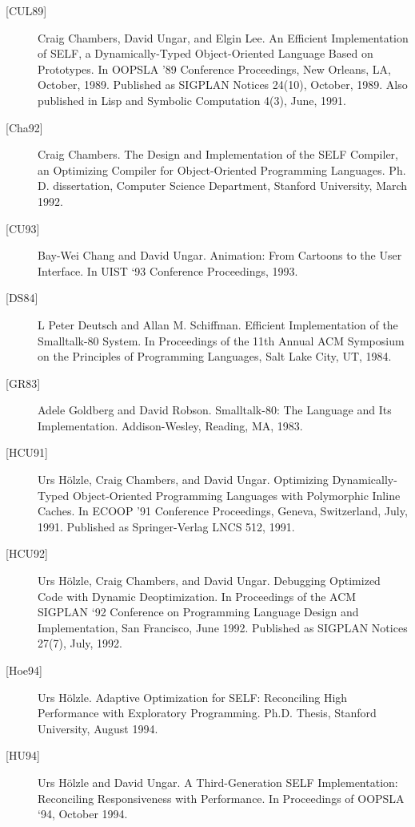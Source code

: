 \documentclass[letterpaper,10pt,english]{sphinxmanual}
\begin{document}
\begin{description}
\item[{{[}CUL89{]}}] \leavevmode
Craig Chambers, David Ungar, and Elgin Lee. An Efficient Implementation of SELF, a Dynamically-Typed Object-Oriented Language Based on Prototypes. In OOPSLA ’89 Conference Proceedings, New Orleans, LA, October, 1989. Published as SIGPLAN Notices 24(10), October, 1989. Also published in Lisp and Symbolic Computation 4(3), June, 1991.

\item[{{[}Cha92{]}}] \leavevmode
Craig Chambers. The Design and Implementation of the SELF Compiler, an Optimizing Compiler for Object-Oriented Programming Languages. Ph. D. dissertation, Computer Science Department, Stanford University, March 1992.

\item[{{[}CU93{]}}] \leavevmode
Bay-Wei Chang and David Ungar. Animation: From Cartoons to the User Interface. In UIST ‘93 Conference Proceedings, 1993.

\item[{{[}DS84{]}}] \leavevmode
L Peter Deutsch and Allan M. Schiffman. Efficient Implementation of the Smalltalk-80 System. In Proceedings of the 11th Annual ACM Symposium on the Principles of Programming Languages, Salt Lake City, UT, 1984.

\item[{{[}GR83{]}}] \leavevmode
Adele Goldberg and David Robson. Smalltalk-80: The Language and Its Implementation. Addison-Wesley, Reading, MA, 1983.

\item[{{[}HCU91{]}}] \leavevmode
Urs Hölzle, Craig Chambers, and David Ungar. Optimizing Dynamically-Typed Object-Oriented Programming Languages with Polymorphic Inline Caches. In ECOOP ’91 Conference Proceedings, Geneva, Switzerland, July, 1991. Published as Springer-Verlag LNCS 512, 1991.

\item[{{[}HCU92{]}}] \leavevmode
Urs Hölzle, Craig Chambers, and David Ungar. Debugging Optimized Code with Dynamic Deoptimization. In Proceedings of the ACM SIGPLAN ‘92 Conference on Programming Language Design and Implementation, San Francisco, June 1992. Published as SIGPLAN Notices 27(7), July, 1992.

\item[{{[}Hoe94{]}}] \leavevmode
Urs Hölzle. Adaptive Optimization for SELF: Reconciling High Performance with Exploratory Programming. Ph.D. Thesis, Stanford University, August 1994.

\item[{{[}HU94{]}}] \leavevmode
Urs Hölzle and David Ungar. A Third-Generation SELF Implementation: Reconciling Responsiveness with Performance. In Proceedings of OOPSLA ‘94, October 1994.


\end{description}
\end{document}
